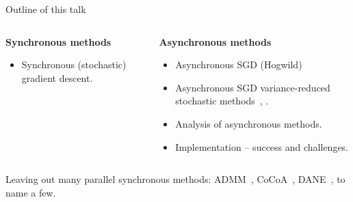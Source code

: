 \documentclass[10pt, notes]{beamer}
\let\oldparencite=\parencite
\renewcommand{\parencite}[1]{\textcolor[rgb]{.7,.7,.7}{\oldparencite{#1}}}
\begin{document}
\begin{frame}{Outline of this talk}
\vspace{2em}\begin{columns}[T] %
\begin{column}{.4\textwidth}
{\centering \bfseries Synchronous methods}
\begin{itemize}
\item Synchronous (stochastic) gradient descent.
\end{itemize}
\end{column}%
\hfill%
\begin{column}{.6\textwidth}
{\centering \bfseries Asynchronous methods}
\begin{itemize}
\item Asynchronous SGD (Hogwild)~\parencite{hogwild2011}
\item Asynchronous SGD variance-reduced stochastic methods~\parencite{leblond2016Asaga}, \parencite{pedregosa2017proxasaga}.
\item Analysis of asynchronous methods. 
\item Implementation -- success and challenges.
\end{itemize}
\end{column}%
\end{columns}
\vspace{1em}

Leaving out many parallel synchronous methods: ADMM~\parencite{glowinski1975approximation}, CoCoA~\parencite{NIPS2014_5599}, DANE~\parencite{shamir2014communication}, to name a few.

\end{frame}
\end{document}
